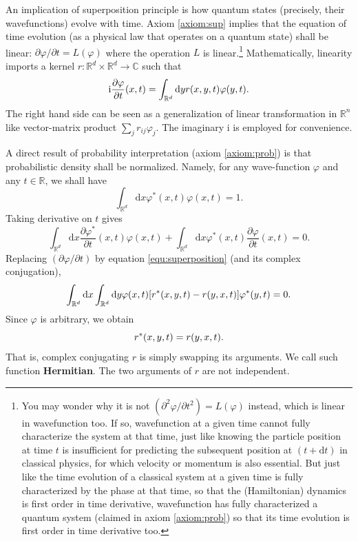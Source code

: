 \documentclass{book}
\newcommand{\mathd}{\mathrm{d}}
\newcommand{\mathi}{\mathrm{i}}
\newcommand{\tmstrong}[1]{\textbf{#1}}
\begin{document}
An implication of superposition principle is how quantum states (precisely,
their wavefunctions) evolve with time. Axiom \ref{axiom:sup} implies that the
equation of time evolution (as a physical law that operates on a quantum
state) shall be linear: $\partial \varphi / \partial t = L (\varphi)$ where
the operation $L$ is linear.\footnote{You may wonder why it is not
$(\partial^2 \varphi / \partial t^2) = L (\varphi)$ instead, which is linear
in wavefunction too. If so, wavefunction at a given time cannot fully
characterize the system at that time, just like knowing the particle position
at time $t$ is insufficient for predicting the subsequent position at $(t +
\mathd t)$ in classical physics, for which velocity or momentum is also
essential. But just like the time evolution of a classical system at a given
time is fully characterized by the phase at that time, so that the
(Hamiltonian) dynamics is first order in time derivative, wavefunction has
fully characterized a quantum system (claimed in axiom \ref{axiom:prob}) so
that its time evolution is first order in time derivative too.}
Mathematically, linearity imports a kernel $r : \mathbb{R}^d \times
\mathbb{R}^d \rightarrow \mathbb{C}$ such that
\begin{equation}
  \mathi \frac{\partial \varphi}{\partial t}  (x, t) = \int_{\mathbb{R}^d}
  \mathd y {\color[HTML]{000000}r (x, y, t)} \varphi (y, t) .
  \label{equ:superposition}
\end{equation}
The right hand side can be seen as a generalization of linear transformation
in $\mathbb{R}^n$ like vector-matrix product $\sum_j r_{ij} \varphi_j$. The
imaginary $\mathi$ is employed for convenience.

A direct result of probability interpretation (axiom \ref{axiom:prob}) is that
probabilistic density shall be normalized. Namely, for any wave-function
$\varphi$ and any $t \in \mathbb{R}$, we shall have
\begin{equation}
  \int_{\mathbb{R}^d} \mathd x \varphi^{\ast} (x, t) \varphi (x, t) = 1.
  \label{eq:probtoself}
\end{equation}
Taking derivative on $t$ gives
\[ \int_{\mathbb{R}^d} \mathd x \frac{\partial \varphi^{\ast}}{\partial t} 
   (x, t) \varphi (x, t) + \int_{\mathbb{R}^d} \mathd x \varphi^{\ast} (x, t)
   \frac{\partial \varphi}{\partial t}  (x, t) = 0. \]
Replacing $(\partial \varphi / \partial t)$ by equation
\ref{equ:superposition} (and its complex conjugation),
\[ \int_{\mathbb{R}^d} \mathd x \int_{\mathbb{R}^d} \mathd y \varphi (x, t) 
   [{\color[HTML]{000000}r^{\ast} (x, y, t)} - {\color[HTML]{000000}r (y, x,
   t)}] \varphi^{\ast} (y, t) = 0. \]
Since $\varphi$ is arbitrary, we obtain
\begin{equation}
  {\color[HTML]{000000}r^{\ast}  (x, y, t)} = {\color[HTML]{000000}r (y, x,
  t)} .
\end{equation}
That is, complex conjugating $r$ is simply swapping its arguments. We call
such function {\tmstrong{Hermitian}}. The two arguments of $r$ are not
independent.
\end{document}
